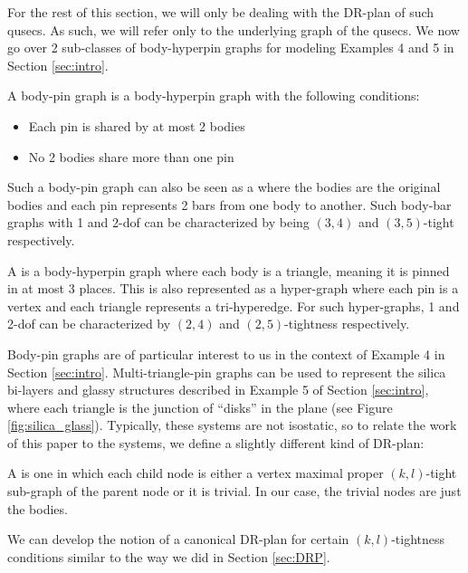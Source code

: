 For the rest of this section, we will only be dealing with the DR-plan  of such qusecs. As such, we will refer only to the underlying graph of the qusecs. We now go over 2 sub-classes of body-hyperpin graphs for modeling Examples 4 and 5 in Section \ref{sec:intro}.

\begin{definition}
\label{def:body-pin}
    A body-pin graph is a body-hyperpin graph with the following conditions:
    \begin{itemize}
        \item Each pin is shared by at most 2 bodies
        \item No 2 bodies share more than one pin
    \end{itemize}
    Such a body-pin graph can also be seen as a  where the bodies are the original bodies and each pin represents 2 bars from one body to another. Such body-bar graphs with 1 and 2-dof can be characterized by being $(3,4)$ and $(3,5)$-tight respectively.
\end{definition}

\begin{definition}
    A  is a body-hyperpin graph where each body is a triangle, meaning it is pinned in at most 3 places. This is also represented as a hyper-graph where each pin is a vertex and each triangle represents a tri-hyperedge. For such hyper-graphs, 1 and 2-dof can be characterized by $(2,4)$ and $(2,5)$-tightness respectively.
\end{definition}

Body-pin graphs are of particular interest to us in the context of Example 4 in Section \ref{sec:intro}. Multi-triangle-pin graphs can be used to represent the silica bi-layers and glassy structures described in Example 5 of Section \ref{sec:intro}, where each triangle is the junction of ``disks'' in the plane (see Figure \ref{fig:silica_glass}). Typically, these systems are not isostatic, so to relate the work of this paper to the systems, we define a slightly different kind of DR-plan:

\begin{definition}
    A  is one in which each child node is either a vertex maximal proper $(k,l)$-tight sub-graph of the parent node or it is trivial. In our case, the trivial nodes are just the bodies.
\end{definition}

We can develop the notion of a canonical DR-plan for certain $(k,l)$-tightness conditions similar to the way we did in Section \ref{sec:DRP}.

